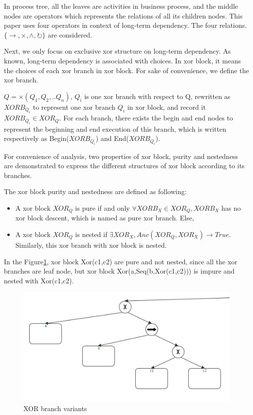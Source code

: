 In process tree, all the leaves are activities in business process, and the middle nodes are operators which represents the relations of all its children nodes\cite{vanderAalst:2016:PMD:2948762,leemans2013discovering}. This paper uses four operators in context of long-term dependency. The four relations.  $\{\rightarrow, \times, \land, \circlearrowright\}$ are considered. 

Next, we only focus on exclusive xor structure on long-term dependency. As known, long-term dependency is associated with choices. In xor block, it means the choices of each xor branch in xor block. For sake of convenience, we define the xor branch.

$Q= \times(Q_1 , Q_2 ,.. Q_n)$, $Q_i$ is one xor branch with respect to Q, rewritten as $XORB_{Q_i}$ to represent one xor branch $Q_i$ in xor block, and record it $XORB_{Q_i} \in XOR_{Q}$. For each branch, there exists the begin and end nodes to represent the beginning and end execution of this branch, which is written respectively as Begin($XORB_{Q_i}$) and End($XORB_{Q_i}$).

For convenience of analysis, two properties of xor block, purity and nestedness are demonstrated to express the different structures of xor block according to its branches.
\begin{definition} The xor block purity and nestedness are defined as following: \\
	\begin{itemize}
		\item A xor block $XOR_Q$ is pure if and only $\forall XORB_X \in XOR_Q, XORB_X $ has no xor block descent, which is named as pure xor branch. Else,
		\item A xor block $XOR_Q$ is nested if $ \exists XOR_X, Anc(XOR_Q, XOR_X) \rightarrow True  $. Similarly, this xor branch with xor block is nested.
	\end{itemize}
\end{definition}
In the Figure\ref {fig:xor_nested_branch_variants}, xor block Xor(c1,c2) are pure and not nested, since all the xor branches are leaf node, but xor block Xor(a,Seq(b,Xor(c1,c2))) is impure and nested with Xor(c1,c2). 
\begin{figure}[h!]
	\includegraphics[width=\textwidth]{figures/preliminaries/PT02_xor_nested_and_pure.png}
	\caption{XOR branch variants}
	\label{fig:xor_nested_branch_variants}
\end{figure}

